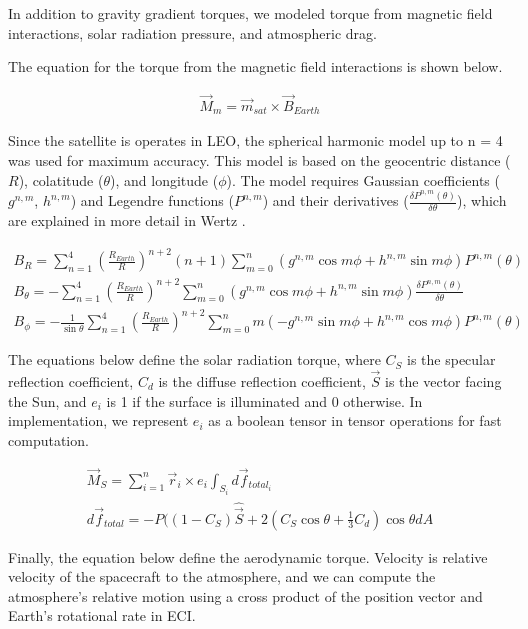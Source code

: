 In addition to gravity gradient torques, we modeled torque from magnetic field interactions, solar radiation pressure, and atmospheric drag.

The equation for the torque from the magnetic field interactions is shown below.

\begin{align*}
    \Vec{M}_{m} = \Vec{m}_{sat} \times \Vec{B}_{Earth}
\end{align*}

Since the satellite is operates in LEO, the spherical harmonic model up to n = 4 was used for maximum accuracy. This model is based on the geocentric distance ($R$), colatitude ($\theta$), and longitude ($\phi$). The model requires Gaussian coefficients ($g^{n,m}$, $h^{n,m}$) and Legendre functions ($P^{n,m}$) and their derivatives ($\frac{\delta P^{n,m} (\theta)}{\delta \theta}$), which are explained in more detail in Wertz \cite{Wertz}.

\begin{align*}
    B_R = \sum^{4}_{n=1} (\frac{R_{Earth}}{R})^{n+2} (n+1) \sum^{n}_{m=0}
    (g^{n,m} \cos{m \phi} + h^{n,m} \sin{m \phi}) P^{n,m}(\theta) \\
    B_{\theta} = - \sum^{4}_{n=1} (\frac{R_{Earth}}{R})^{n+2} \sum^{n}_{m=0}
    (g^{n,m} \cos{m \phi} + h^{n,m} \sin{m \phi}) \frac{\delta P^{n,m} (\theta)}{\delta \theta} \\
    B_{\phi} = - \frac{1}{\sin{\theta}} \sum^{4}_{n=1} (\frac{R_{Earth}}{R})^{n+2}
    \sum^{n}_{m=0} m (-g^{n,m} \sin{m \phi} + h^{n,m} \cos{m \phi}) P^{n,m}(\theta)
\end{align*}

The equations below define the solar radiation torque, where $C_S$ is the specular reflection coefficient, $C_d$ is the diffuse reflection coefficient, $\Vec{S}$ is the vector facing the Sun, and $e_i$ is 1 if the surface is illuminated and 0 otherwise. In implementation, we represent $e_i$ as a boolean tensor in tensor operations for fast computation.

\begin{align*}
    \Vec{M}_{S} = \sum^{n}_{i=1} \Vec{r}_{i} \times e_i \int_{S_i} d \Vec{f}_{total_{i}} \\
    d \Vec{f}_{total} = -P ((1-C_S) \hat{\Vec{S}} + 2 (C_S \cos{\theta} + \frac{1}{3} C_d) \cos{\theta} dA
\end{align*}

Finally, the equation below define the aerodynamic torque. Velocity is relative velocity of the spacecraft to the atmosphere, and we can compute the atmosphere's relative motion using a cross product of the position vector and Earth's rotational rate in ECI.

